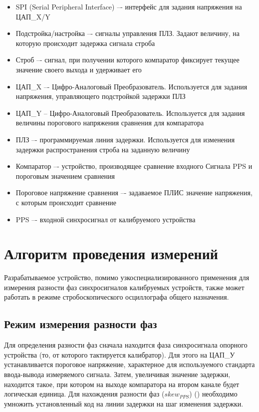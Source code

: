 \FloatBarrier


\begin{itemize}[label={}]
	\item SPI (Serial Peripheral Interface) –- интерфейс для задания напряжения на ЦАП\_X/Y
	\item Подстройка/настройка –- сигналы управления ПЛЗ. Задают величину, на которую происходит задержка сигнала строба
	\item Строб –- сигнал, при получении которого компаратор фиксирует текущее значение своего выхода и удерживает его
	\item ЦАП\_X –- Цифро-Аналоговый Преобразователь. Используется для задания напряжения, управляющего подстройкой задержки ПЛЗ
	\item ЦАП\_Y -- Цифро-Аналоговый Преобразователь. Используется для задания величины порогового напряжения сравнения для компаратора
	\item ПЛЗ –- программируемая линия задержки. Используется для изменения задержки распространения строба на заданную величину
	\item Компаратор –- устройство, производящее сравнение входного Сигнала PPS и пороговым значением сравнения
	\item Пороговое напряжение сравнения –- задаваемое ПЛИС значение напряжения, с которым происходит сравнение
	\item PPS –- входной синхросигнал от калибруемого устройства
\end{itemize}

\section{Алгоритм проведения измерений}

Разрабатываемое устройство, помимо узкоспециализированного применения для измерения разности фаз синхросигналов
калибруемых устройств, также может работать в режиме стробоскопического осциллографа общего назначения.

\subsection{Режим измерения разности фаз}

Для определения разности фаз сначала находится фаза синхросигнала опорного устройства (то, от которого тактируется калибратор). Для этого
на ЦАП\_У устанавливается пороговое напряжение, характерное для используемого стандарта ввода-вывода
измеряемого сигнала. Затем, увеличивая значение задержки, находится такое,
при котором на выходе компаратора на втором канале будет логическая единица. Для нахождения разности фаз ($ skew_{PPS} $) ()
необходимо умножить установленный код на линии задержки на шаг изменения задержки.

